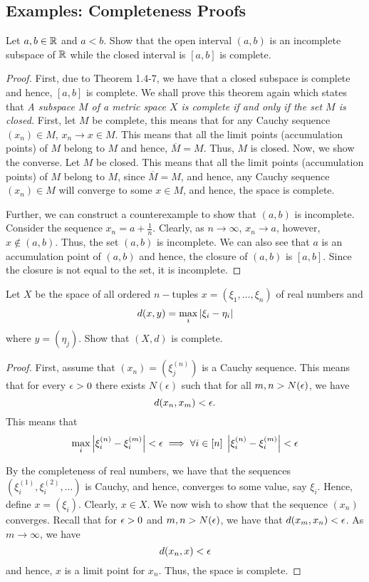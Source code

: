 \subsection{Examples: Completeness Proofs}

\begin{question}
    Let $a,b \in \mathbb{R}$ and $a < b$. Show that the open interval $(a,b)$ is an incomplete subspace of $\mathbb{R}$ while the closed interval is $[a,b]$ is complete.
    \label{section1.5-1}
\end{question}
\begin{proof}
    First, due to Theorem 1.4-7, we have that a closed subspace is complete and hence, $[a,b]$ is complete. We shall prove this theorem again which states that \emph{A subspace $M$ of a metric space $X$ is complete if and only if the set $M$ is closed.} First, let $M$ be complete, this means that for any Cauchy sequence $(x_n) \in M$, $x_n \rightarrow x \in M$. This means that all the limit points (accumulation points) of $M$ belong to $M$ and hence, $\overline{M} = M$. Thus, $M$ is closed. Now, we show the converse. Let $M$ be closed. This means that all the limit points (accumulation points) of $M$ belong to $M$, since $\overline{M} = M$, and hence, any Cauchy sequence $(x_n) \in M$ will converge to some $x \in M$, and hence, the space is complete.

    Further, we can construct a counterexample to show that $(a,b)$ is incomplete. Consider the sequence $x_n = a + \frac{1}{n}$. Clearly, as $n \rightarrow \infty$, $x_n \rightarrow a$, however, $x \notin (a,b)$. Thus, the set $(a,b)$ is incomplete. We can also see that $a$ is an accumulation point of $(a,b)$ and hence, the closure of $(a,b)$ is $[a,b]$. Since the closure is not equal to the set, it is incomplete.
\end{proof}

\begin{question}
    Let $X$ be the space of all ordered $n-$tuples $x = (\xi_1 , \ldots , \xi_n)$ of real numbers and 
    \[d(x,y) = \max_i \left\lvert \xi_i - \eta_i \right\rvert\]
    where $y = (\eta_j)$. Show that $(X,d)$ is complete.
    \label{section1.5-2}
\end{question}
\begin{proof}
    First, assume that $(x_n) = (\xi_j^{(n)})$ is a Cauchy sequence. This means that for every $\epsilon > 0$ there exists $N(\epsilon)$ such that for all $m,n > N(\epsilon)$, we have
    \[d(x_n , x_m) < \epsilon.\]
    This means that 
    \[\max_{i} \left\lvert \xi_i^{(n)} - \xi_i^{(m)} \right\rvert < \epsilon \implies \forall i \in [n] \; \left\lvert \xi_i^{(n)} - \xi_i^{(m)} \right\rvert < \epsilon\]

    By the completeness of real numbers, we have that the sequences $(\xi_i^{(1)} , \xi_i^{(2)} , \ldots)$ is Cauchy, and hence, converges to some value, say $\xi_i$. Hence, define $x = (\xi_i)$. Clearly, $x \in X$. We now wish to show that the sequence $(x_n)$ converges. Recall that for $\epsilon > 0$ and $m,n > N(\epsilon)$, we have that $d(x_m , x_n) < \epsilon$. As $m \rightarrow \infty$, we have
    \[d(x_n , x) < \epsilon\]
    and hence, $x$ is a limit point for $x_n$. Thus, the space is complete.
\end{proof}

